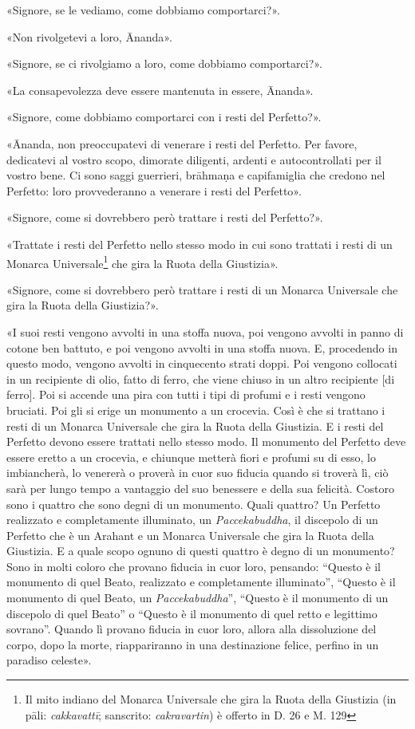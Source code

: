 «Signore, se le vediamo, come dobbiamo comportarci?».


«Non rivolgetevi a loro, Ānanda».


«Signore, se ci rivolgiamo a loro, come dobbiamo comportarci?».


«La consapevolezza deve essere mantenuta in essere, Ānanda».


«Signore, come dobbiamo comportarci con i resti del Perfetto?».


«Ānanda, non preoccupatevi di venerare i resti del Perfetto. Per favore,
dedicatevi al vostro scopo, dimorate diligenti, ardenti e
autocontrollati per il vostro bene. Ci sono saggi guerrieri, brāhmaṇa e
capifamiglia che credono nel Perfetto: loro provvederanno a venerare i
resti del Perfetto».


«Signore, come si dovrebbero però trattare i resti del Perfetto?».


«Trattate i resti del Perfetto nello stesso modo in cui sono trattati i
resti di un Monarca Universale\footnote{Il mito indiano del Monarca Universale che gira la Ruota della Giustizia (in pāli: \emph{cakkavattī}; sanscrito: \emph{cakravartin}) è offerto in D. 26 e M. 129} che gira la Ruota della Giustizia».


«Signore, come si dovrebbero però trattare i resti di un Monarca
Universale che gira la Ruota della Giustizia?».


«I suoi resti vengono avvolti in una stoffa nuova, poi vengono avvolti
in panno di cotone ben battuto, e poi vengono avvolti in una stoffa
nuova. E, procedendo in questo modo, vengono avvolti in cinquecento
strati doppi. Poi vengono collocati in un recipiente di olio, fatto di
ferro, che viene chiuso in un altro recipiente [di ferro]. Poi si
accende una pira con tutti i tipi di profumi e i resti vengono bruciati.
Poi gli si erige un monumento a un crocevia. Così è che si trattano i
resti di un Monarca Universale che gira la Ruota della Giustizia. E i
resti del Perfetto devono essere trattati nello stesso modo. Il
monumento del Perfetto deve essere eretto a un crocevia, e chiunque
metterà fiori e profumi su di esso, lo imbiancherà, lo venererà o
proverà in cuor suo fiducia quando si troverà lì, ciò sarà per lungo
tempo a vantaggio del suo benessere e della sua felicità. Costoro sono i
quattro che sono degni di un monumento. Quali quattro? Un Perfetto
realizzato e completamente illuminato, un \emph{Paccekabuddha}, il discepolo
di un Perfetto che è un Arahant e un Monarca Universale che gira la
Ruota della Giustizia. E a quale scopo ognuno di questi quattro è degno
di un monumento? Sono in molti coloro che provano fiducia in cuor loro,
pensando: “Questo è il monumento di quel Beato, realizzato e
completamente illuminato”, “Questo è il monumento di quel Beato, un
\emph{Paccekabuddha}”, “Questo è il monumento di un discepolo di quel Beato”
o “Questo è il monumento di quel retto e legittimo sovrano”. Quando lì
provano fiducia in cuor loro, allora alla dissoluzione del corpo, dopo
la morte, riappariranno in una destinazione felice, perfino in un
paradiso celeste».


